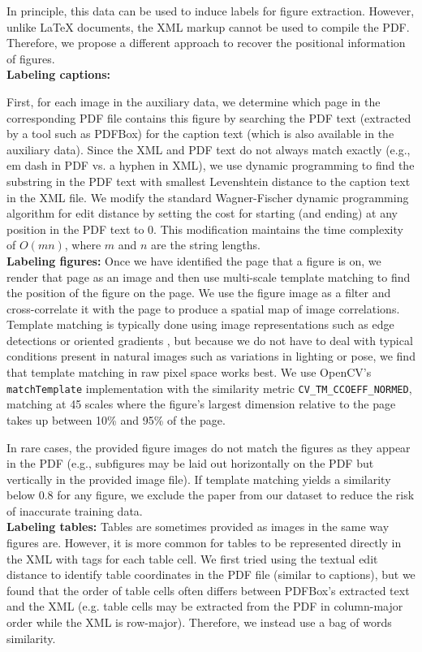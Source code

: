 \documentclass[sigconf]{acmart}
\begin{document}
In principle, this data can be used to induce labels for figure extraction.
However, unlike LaTeX documents, the XML markup cannot be used to compile the PDF.
Therefore, we propose a different approach to recover the positional information of figures.
\\[15pt]\textbf{Labeling captions:}

First, for each image in the auxiliary data, we determine which page in the corresponding PDF file contains this figure by searching the PDF text (extracted by a tool such as PDFBox) for the caption text (which is also available in the auxiliary data).
Since the XML and PDF text do not always match exactly (e.g., em dash in PDF vs. a hyphen in XML), we use dynamic programming to find the substring in the PDF text with smallest Levenshtein distance to the caption text in the XML file.
We modify the standard Wagner-Fischer dynamic programming algorithm for edit distance \cite{wagner1974string} by setting the cost for starting (and ending) at any position in the PDF text to 0.
This modification maintains the time complexity of $O(mn)$, where $m$ and $n$ are the string lengths. 
\\[15pt]\textbf{Labeling figures:}%
Once we have identified the page that a figure is on, we render that page as an image and then use multi-scale template matching \cite{brunelli2009template} to find the position of the figure on the page.
We use the figure image as a filter and cross-correlate it with the page to produce a spatial map of image correlations. 
Template matching is typically done using image representations such as edge detections or oriented gradients \cite{brunelli2009template}, but because we do not have to deal with typical conditions present in natural images such as variations in lighting or pose, we find that template matching in raw pixel space works best. 
We use OpenCV's \texttt{matchTemplate} implementation with the similarity metric \texttt{CV\_TM\_CCOEFF\_NORMED}, matching at 45 scales where the figure's largest dimension relative to the page takes up between 10\% and 95\% of the page. 

In rare cases, the provided figure images do not match the figures as they appear in the PDF (e.g., subfigures may be laid out horizontally on the PDF but vertically in the provided image file). 
If template matching yields a similarity below 0.8 for any figure, we exclude the paper from our dataset to reduce the risk of inaccurate training data.
\\[15pt]\textbf{Labeling tables:}%
Tables are sometimes provided as images in the same way figures are.
However, it is more common for tables to be represented directly in the XML with tags for each table cell. 
We first tried using the textual edit distance to identify table coordinates in the PDF file (similar to captions), but we found that the order of table cells often differs between PDFBox's extracted text and the XML (e.g. table cells may be extracted from the PDF in column-major order while the XML is row-major). 
Therefore, we instead use a bag of words similarity. 
\end{document}
